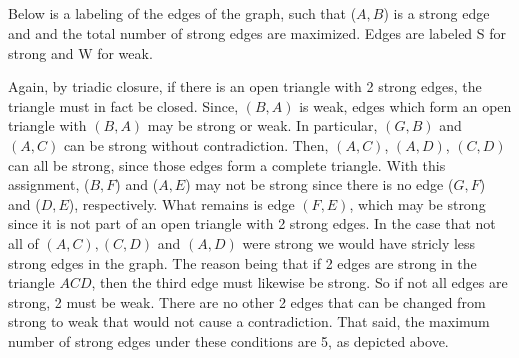 \documentclass[12pt]{article}
\begin{document}
\subsection{}
Below is a labeling of the edges of the graph, such that ($A,B$) is a strong edge and and the total number of strong edges are maximized. Edges are labeled S for strong and W for weak.  
\newline 
\newline 
{}
\newline 
\newline 
Again, by triadic closure, if there is an open triangle with 2 strong edges, the triangle must in fact be closed. Since, $(B,A)$ is weak, edges which form an open triangle with $(B,A)$ may be strong or weak. In particular, $(G,B)$ and $(A,C)$ can be strong without contradiction. Then, $(A,C)$, $(A,D)$, $(C,D)$ can all be strong, since those edges form a complete triangle. With this assignment, ($B,F$) and ($A,E$) may not be strong since there is no edge ($G,F$) and ($D,E$), respectively. What remains is edge $(F,E)$, which may be strong since it is not part of an open triangle with 2 strong edges. In the case that not all of $(A,C), (C,D)$ and $(A,D)$ were strong we would have stricly less strong edges in the graph. The reason being that if 2 edges are strong in the triangle $ACD$, then the third edge must likewise be strong. So if not all edges are strong, 2 must be weak. There are no other 2 edges that can be changed from strong to weak that would not cause a contradiction. That said, the maximum number of strong edges under these conditions are 5, as depicted above.  
\newpage
\end{document}

